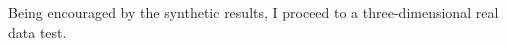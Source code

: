 Being encouraged by the synthetic results, I proceed to a
three-dimensional real data test.

\begin{comment}

\subsection{3-D data regularization with the offset continuation equation}

3-D differential offset continuation amounts to applying two
differential filters, operating on the in-line and cross-line
projections of the offset and midpoint coordinates. The corresponding
system of differential equations has the form
\begin{equation} 
\displaystyle
  \left\{\begin{array}{rcl} 
      \displaystyle
      h_1 \, \left( {\partial^2 \tilde{P} \over \partial y_1^2} - 
        {\partial^2 \tilde{P} \over \partial h_1^2} \right) - 
      i\,\Omega \, {\partial \tilde{P} \over   {\partial h_1}} & = & 0\;; \\
      \displaystyle
      h_2 \, \left( {\partial^2 \tilde{P} \over \partial y_2^2} - 
        {\partial^2 \tilde{P} \over \partial h_2^2} \right) - 
      i\,\Omega \, {\partial \tilde{P} \over   {\partial h_2}} & = & 0\;,
    \end{array}\right.
  \label{eqn:OC-3D} 
\end{equation}
where $y_1$ and $y_2$ correspond to the in-line and cross-line
midpoint coordinates, and $h_1$ and $h_2$ correspond to the in-line
and cross-line offsets.  The projection approach is justified in the
theory of azimuth moveout \cite{amo,GEO63-02-05740588}.
 
The result of a 3-D data regularization test is shown in
Figure~\ref{fig:off4}. The input data is a subset of a 3-D marine
dataset from the North Sea, complicated by salt dome reflections and
diffractions. The same dataset was used previously for testing azimuth
moveout \cite{GEO63-02-05740588}. I used neighboring offsets in the
in-line and cross-line directions and the differential 3-D offset
continuation to reconstruct the empty traces in a selected midpoint
cube. Although the reconstruction is not entirely accurate, it
successfully fulfills the following goals:
\begin{itemize}
\item The input traces are well hidden in the interpolation result. It
  is impossible to distinguish between input and interpolated traces.
\item The main structural features are restored without using any
  assumptions about structural continuity in the midpoint domain. Only
  the physical offset continuity is used.
\end{itemize}


\end{comment}

